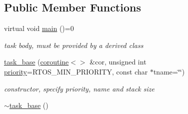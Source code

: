 \subsection*{Public Member Functions}
\begin{DoxyCompactItemize}
\item 
virtual void \hyperlink{classrtos_1_1task__base_a67892c7e1f734e0a91baa5a4fc6dea27}{main} ()=0
\begin{DoxyCompactList}\small\item\em task body, must be provided by a derived class \end{DoxyCompactList}\item 
\hyperlink{classrtos_1_1task__base_aa7a9351a480725a93f1c2f99451e28e2}{task\+\_\+base} (\hyperlink{classcoroutine}{coroutine}$<$$>$ \&cor, unsigned int \hyperlink{classrtos_1_1task__base_a7c9b75a929b0d2ccceb440d6d9e5ba6a}{priority}=R\+T\+O\+S\+\_\+\+M\+I\+N\+\_\+\+P\+R\+I\+O\+R\+I\+TY, const char $\ast$tname=\char`\"{}\char`\"{})
\begin{DoxyCompactList}\small\item\em constructor, specify priority, name and stack size \end{DoxyCompactList}\item 
\hyperlink{classrtos_1_1task__base_a8df882df03cd39af4f21609ba1e002e4}{$\sim$task\+\_\+base} ()\hypertarget{classrtos_1_1task__base_a8df882df03cd39af4f21609ba1e002e4}{}\label{classrtos_1_1task__base_a8df882df03cd39af4f21609ba1e002e4}


\end{DoxyCompactItemize}
